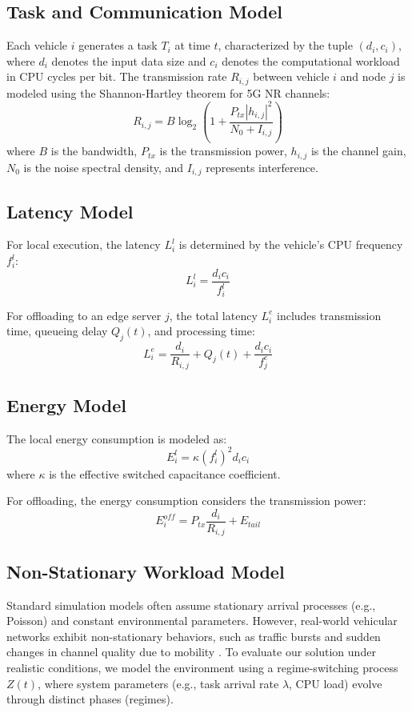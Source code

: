 \documentclass[iicol]{sn-jnl}
\begin{document}
\subsection{Task and Communication Model}
Each vehicle $i$ generates a task $T_i$ at time $t$, characterized by the tuple $(d_i, c_i)$, where $d_i$ denotes the input data size and $c_i$ denotes the computational workload in CPU cycles per bit.
The transmission rate $R_{i,j}$ between vehicle $i$ and node $j$ is modeled using the Shannon-Hartley theorem for 5G NR channels:
\begin{equation}
    R_{i,j} = B \log_2\left(1 + \frac{P_{tx} |h_{i,j}|^2}{N_0 + I_{i,j}}\right)
\end{equation}
where $B$ is the bandwidth, $P_{tx}$ is the transmission power, $h_{i,j}$ is the channel gain, $N_0$ is the noise spectral density, and $I_{i,j}$ represents interference.

\subsection{Latency Model}
For local execution, the latency $L_i^l$ is determined by the vehicle's CPU frequency $f_i^l$:
\begin{equation}
    L_i^l = \frac{d_i c_i}{f_i^l}
\end{equation}

For offloading to an edge server $j$, the total latency $L_i^e$ includes transmission time, queueing delay $Q_j(t)$, and processing time:
\begin{equation}
    L_i^e = \frac{d_i}{R_{i,j}} + Q_{j}(t) + \frac{d_i c_i}{f_j^e}
\end{equation}

\subsection{Energy Model}
The local energy consumption is modeled as:
\begin{equation}
    E_i^l = \kappa (f_i^l)^2 d_i c_i
\end{equation}
where $\kappa$ is the effective switched capacitance coefficient.

For offloading, the energy consumption considers the transmission power:
\begin{equation}
    E_i^{off} = P_{tx} \frac{d_i}{R_{i,j}} + E_{tail}
\end{equation}

\subsection{Non-Stationary Workload Model}
Standard simulation models often assume stationary arrival processes (e.g., Poisson) and constant environmental parameters. However, real-world vehicular networks exhibit non-stationary behaviors, such as traffic bursts and sudden changes in channel quality due to mobility \cite{leland1994self, paxson1995wide}.
To evaluate our solution under realistic conditions, we model the environment using a regime-switching process $Z(t)$, where system parameters (e.g., task arrival rate $\lambda$, CPU load) evolve through distinct phases (regimes).
\end{document}
